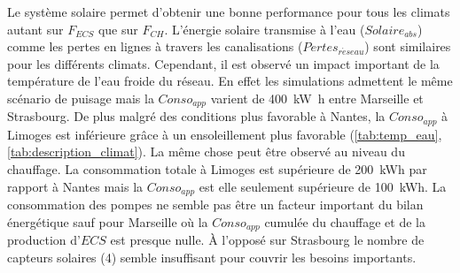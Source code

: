 Le système solaire permet d’obtenir une bonne performance pour tous les climats autant sur
$F_{ECS}$ que sur $F_{CH}$. L’énergie solaire transmise à l’eau ($Solaire_{abs}$) comme
les pertes en lignes à travers les canalisations ($Pertes_{r\acute eseau}$) sont similaires pour
les différents climats. Cependant, il est observé un impact important de la température
de l’eau froide du réseau. En effet les simulations admettent le même scénario de puisage
mais la $Conso_{app}$ varient de \SI{400}{\kilo\watt\hour} entre Marseille et Strasbourg.
De plus malgré des conditions plus favorable à Nantes, la $Conso_{app}$ à
Limoges est inférieure grâce à un ensoleillement plus favorable (\autoref{tab:temp_eau},
\autoref{tab:description_climat}). La même chose peut être observé au niveau du chauffage.
La consommation totale à Limoges est supérieure de \SI{200}{kWh} par rapport à Nantes mais
la $Conso_{app}$ est elle seulement supérieure de \SI{100}{kWh}.
La consommation des pompes ne semble pas être un facteur important du bilan énergétique sauf pour
Marseille où la $Conso_{app}$ cumulée du chauffage et de la
production d’$ECS$ est presque nulle. À l’opposé sur Strasbourg le nombre
de capteurs solaires (4) semble insuffisant pour couvrir les besoins importants.

